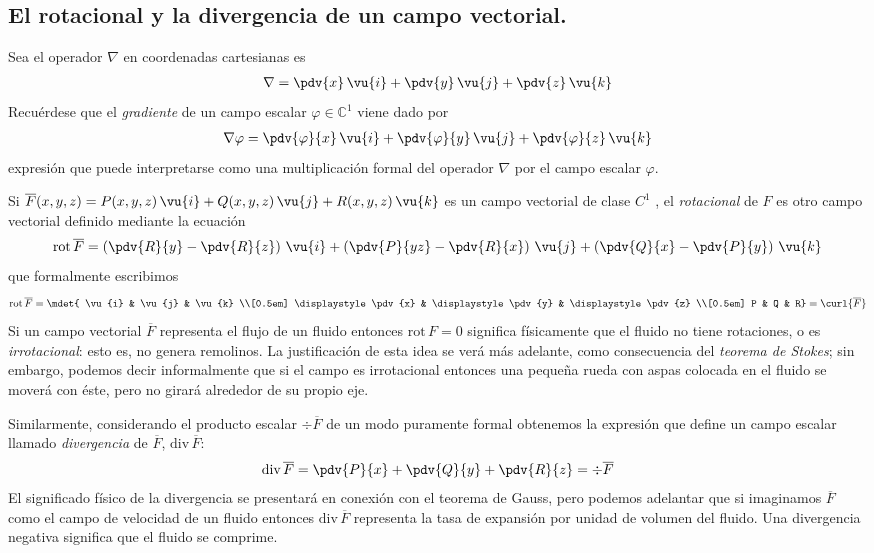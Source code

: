\subsection{El rotacional y la divergencia de un campo vectorial.}
Sea el operador $\nabla$ en coordenadas cartesianas es
\begin{align*}
\nabla = \pdv{x} \, \vu{i} + \pdv{y} \, \vu{j} + \pdv{z} \, \vu{k} 
\end{align*}
Recuérdese que el \emph{gradiente} de un campo escalar $\varphi \in \mathbb{C}^{1}$ viene dado por
\begin{align*}
\nabla \varphi = \pdv{\varphi}{x} \, \vu{i} + \pdv{\varphi}{y} \, \vu{j} + \pdv{\varphi}{z} \, \vu{k} 
\end{align*}
expresión que puede interpretarse como una multiplicación formal del operador $\nabla$ por el campo escalar $\varphi$.
\par
Si $\overline{F}(x, y, z) = P(x, y, z) \, \vu{i} + Q(x, y, z) \, \vu{j} + R(x, y, z) \, \vu{k}$ es un campo vectorial de clase $C^{1}$ , el \emph{rotacional} de $F$ es otro campo vectorial definido mediante la ecuación
\begin{align*}
\text{rot} \, \overline{F} =  \left( \pdv{R}{y} - \pdv{R}{z} \right) \, \vu{i} + \left( \pdv{P}{yz} - \pdv{R}{x} \right) \, \vu{j} + \left( \pdv{Q}{x} - \pdv{P}{y} \right) \, \vu{k}
\end{align*}
que formalmente escribimos
\begin{align*}
\text{rot} \, \overline{F} = \mdet{
\vu{i} & \vu{j} & \vu{k} \\[0.5em]
\displaystyle \pdv{x} & \displaystyle \pdv{y} & \displaystyle \pdv{z} \\[0.5em]
P & Q & R} = \curl{\overline{F}}
\end{align*}
Si un campo vectorial $\overline{F}$ representa el flujo de un fluido entonces $\text{rot} \, F = 0$ significa físicamente que el fluido no tiene rotaciones, o es \emph{irrotacional}: esto es, no genera remolinos. La justificación de esta idea se verá más adelante, como consecuencia del \emph{teorema de Stokes}; sin embargo, podemos decir informalmente que si el
campo es irrotacional entonces una pequeña rueda con aspas colocada en el fluido se moverá con éste, pero no
girará alrededor de su propio eje.
\par
Similarmente, considerando el producto escalar $\div{\overline{F}}$ de un modo puramente formal obtenemos la expresión que define un campo escalar llamado \emph{divergencia} de $\overline{F}$, $\text{div} \, \overline{F}$:
\begin{align*}
\text{div} \, \overline{F} = \pdv{P}{x} + \pdv{Q}{y} + \pdv{R}{z} = \div{\overline{F}}
\end{align*}
El significado físico de la divergencia se presentará en conexión con el teorema de Gauss, pero podemos adelantar que si imaginamos $\overline{F}$ como el campo de velocidad de un fluido entonces $\text{div} \, \overline{F}$ representa la tasa de expansión por unidad de volumen del fluido. Una divergencia negativa significa que el fluido se comprime.
